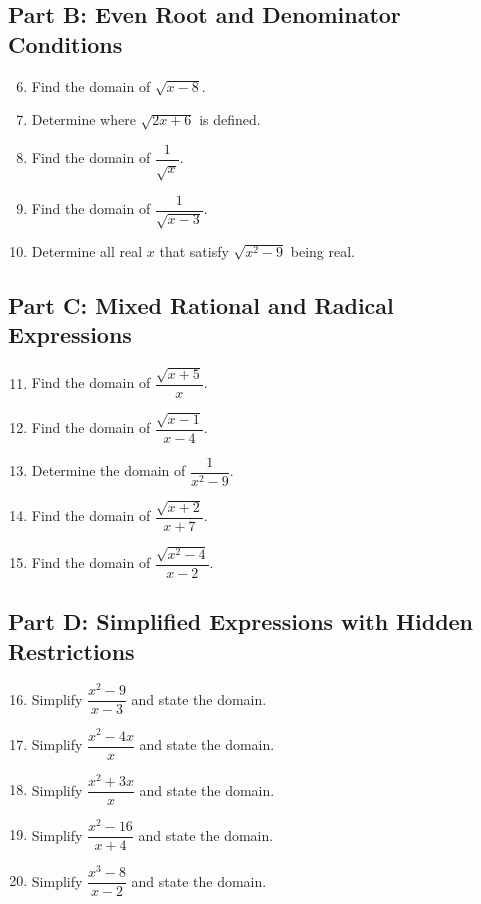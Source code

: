 \documentclass[14pt]{extarticle}
\begin{document}
\subsection*{Part B: Even Root and Denominator Conditions}
\begin{enumerate}
  \setcounter{enumi}{5}
  \item Find the domain of \(\sqrt{x - 8}\).
  \item Determine where \(\sqrt{2x + 6}\) is defined.
  \item Find the domain of \(\dfrac{1}{\sqrt{x}}\).
  \item Find the domain of \(\dfrac{1}{\sqrt{x - 3}}\).
  \item Determine all real \(x\) that satisfy \(\sqrt{x^2 - 9}\) being real.
\end{enumerate}

\subsection*{Part C: Mixed Rational and Radical Expressions}
\begin{enumerate}
  \setcounter{enumi}{10}
  \item Find the domain of \(\dfrac{\sqrt{x + 5}}{x}\).
  \item Find the domain of \(\dfrac{\sqrt{x - 1}}{x - 4}\).
  \item Determine the domain of \(\dfrac{1}{x^2 - 9}\).
  \item Find the domain of \(\dfrac{\sqrt{x + 2}}{x + 7}\).
  \item Find the domain of \(\dfrac{\sqrt{x^2 - 4}}{x - 2}\).
\end{enumerate}

\subsection*{Part D: Simplified Expressions with Hidden Restrictions}
\begin{enumerate}
  \setcounter{enumi}{15}
  \item Simplify \(\dfrac{x^2 - 9}{x - 3}\) and state the domain.
  \item Simplify \(\dfrac{x^2 - 4x}{x}\) and state the domain.
  \item Simplify \(\dfrac{x^2 + 3x}{x}\) and state the domain.
  \item Simplify \(\dfrac{x^2 - 16}{x + 4}\) and state the domain.
  \item Simplify \(\dfrac{x^3 - 8}{x - 2}\) and state the domain.
\end{enumerate}
\end{document}
